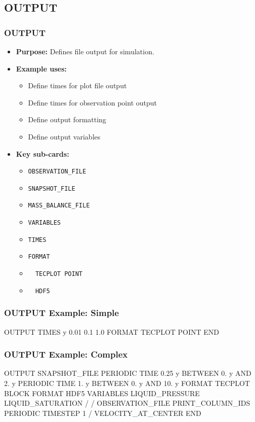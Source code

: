 \subsection{OUTPUT}

\begin{frame}\frametitle{OUTPUT}

\begin{itemize}
\item[] \textbf{Purpose:} Defines file output for simulation.
\item[] \textbf{Example uses:}
\begin{itemize}
  \item Define times for plot file output
  \item Define times for observation point output
  \item Define output formatting
  \item Define output variables
\end{itemize}
\item[] \textbf{Key sub-cards:}
\begin{itemize}
  \item[] \verb|OBSERVATION_FILE|
  \item[] \verb|SNAPSHOT_FILE|
  \item[] \verb|MASS_BALANCE_FILE|
  \item[] \verb|VARIABLES|
  \item[] \verb|TIMES|
  \item[] \verb|FORMAT|
  \item[] \verb|  TECPLOT POINT|
  \item[] \verb|  HDF5|
\end{itemize}
\end{itemize}

\end{frame}

\begin{frame}[fragile]\frametitle{OUTPUT Example: Simple}

\begin{semiverbatim}
OUTPUT
  TIMES y 0.01 0.1 1.0
  FORMAT TECPLOT POINT
END
\end{semiverbatim}

\end{frame}

\begin{frame}[fragile]\frametitle{OUTPUT Example: Complex}

\begin{semiverbatim}
OUTPUT
  SNAPSHOT_FILE
    PERIODIC TIME 0.25 y BETWEEN 0. y AND 2. y
    PERIODIC TIME 1. y BETWEEN 0. y AND 10. y
    FORMAT TECPLOT BLOCK
    FORMAT HDF5
    VARIABLES
      LIQUID_PRESSURE
      LIQUID_SATURATION
    /
  /
  OBSERVATION_FILE
    PRINT_COLUMN_IDS
    PERIODIC TIMESTEP 1
  /
  VELOCITY_AT_CENTER
END
\end{semiverbatim}

\end{frame}

